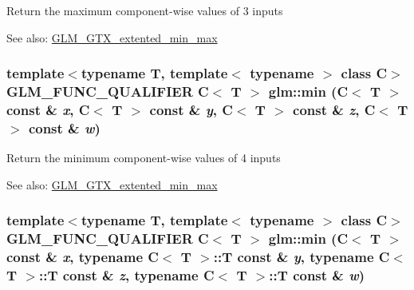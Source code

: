 Return the maximum component-wise values of 3 inputs \begin{Desc}
\item[See also:]\hyperlink{group__gtx__extented__min__max}{GLM\_\-GTX\_\-extented\_\-min\_\-max} \end{Desc}
\hypertarget{group__gtx__extented__min__max_gca95a5fd4be0ad53f4474e69867bf974}{
\subsubsection[min]{\setlength{\rightskip}{0pt plus 5cm}template$<$typename T, template$<$ typename $>$ class C$>$ GLM\_\-FUNC\_\-QUALIFIER C$<$ T $>$ glm::min (C$<$ T $>$ const \& {\em x}, \/  C$<$ T $>$ const \& {\em y}, \/  C$<$ T $>$ const \& {\em z}, \/  C$<$ T $>$ const \& {\em w})}}
\label{group__gtx__extented__min__max_gca95a5fd4be0ad53f4474e69867bf974}


Return the minimum component-wise values of 4 inputs \begin{Desc}
\item[See also:]\hyperlink{group__gtx__extented__min__max}{GLM\_\-GTX\_\-extented\_\-min\_\-max} \end{Desc}
\hypertarget{group__gtx__extented__min__max_g8c81655ede8d78e3c7d8294cdef3f483}{
\subsubsection[min]{\setlength{\rightskip}{0pt plus 5cm}template$<$typename T, template$<$ typename $>$ class C$>$ GLM\_\-FUNC\_\-QUALIFIER C$<$ T $>$ glm::min (C$<$ T $>$ const \& {\em x}, \/  typename C$<$ T $>$::T const \& {\em y}, \/  typename C$<$ T $>$::T const \& {\em z}, \/  typename C$<$ T $>$::T const \& {\em w})}}
\label{group__gtx__extented__min__max_g8c81655ede8d78e3c7d8294cdef3f483}


